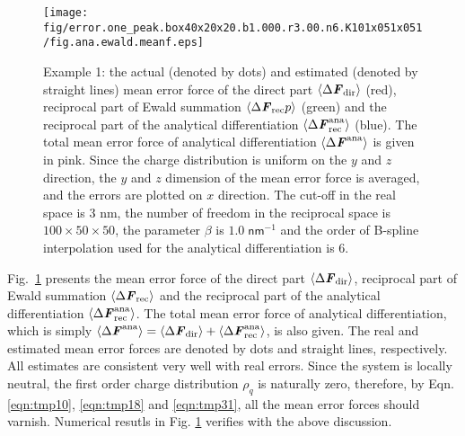 \documentclass[aps,pre,preprint]{revtex4}
\renewcommand{\v}[1]{\textbf{\textit{#1}}}
\begin{document}
\begin{figure}
  \centering
  \texttt{[image: fig/error.one\_peak.box40x20x20.b1.000.r3.00.n6.K101x051x051/fig.ana.ewald.meanf.eps]}
  \caption{Example 1: the actual (denoted by dots) and estimated
    (denoted by straight lines) mean error force of the direct part
    $\langle\Delta \v F_{\textrm{dir}}\rangle$ (red), reciprocal
    part of Ewald summation $\langle\Delta \v F_{\textrm{rec}}p\rangle$ (green) and the reciprocal part of the analytical
    differentiation $\langle\Delta \v
    F^{\textrm{ana}}_{\textrm{rec}}\rangle$ (blue). The total
    mean error force of analytical differentiation $\langle\Delta \v
    F^{\textrm{ana}}\rangle$ is given in pink.  Since the charge
    distribution is uniform on the $y$ and $z$ direction, the $y$ and
    $z$ dimension of the mean error force is averaged, and the errors
    are plotted on $x$ direction.  The cut-off in the real space is 3
    \textsf{nm}, the number of freedom in the reciprocal space is
    $100\times 50\times 50$, the parameter $\beta$ is $1.0\;
    \textsf{nm}^{-1}$ and the order of B-spline interpolation used for
    the analytical differentiation is 6.}
  \label{fig:meanf1}
\end{figure}

Fig.~\ref{fig:meanf1} presents the mean error force of the direct part
$\langle\Delta \v F_{\textrm{dir}}\rangle$, reciprocal part of Ewald
summation $\langle\Delta \v F_{\textrm{rec}}\rangle$ and the
reciprocal part of the analytical differentiation $\langle\Delta \v
F^{\textrm{ana}}_{\textrm{rec}}\rangle$. The total mean error force of
analytical differentiation, which is simply $\langle\Delta \v
F^{\textrm{ana}}\rangle = \langle\Delta \v F_{\textrm{dir}}\rangle +
\langle\Delta \v F^{\textrm{ana}}_{\textrm{rec}}\rangle$, is also
given.  The real and estimated mean error forces are denoted by dots
and straight lines, respectively. All estimates are consistent very
well with real errors.  Since the system is locally neutral, the first
order charge distribution $\rho_q$ is naturally zero, therefore, by
Eqn. \eqref{eqn:tmp10}, \eqref{eqn:tmp18} and \eqref{eqn:tmp31}, all
the mean error forces should varnish. Numerical resutls in
Fig. \ref{fig:meanf1} verifies with the above discussion.
\end{document}
